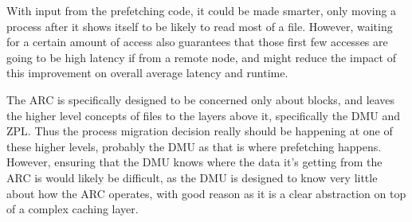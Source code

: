 With input from the prefetching code, it could be made smarter, 
only moving a process after it shows itself to be likely to read most of a file.
However, waiting for a certain amount of access also guarantees that those first few accesses are going to be high latency if from a remote node, and might reduce the impact of this improvement on overall average latency and runtime.

The ARC is specifically designed to be concerned only about blocks, and leaves the higher level concepts of
files to the layers above it, specifically the DMU and ZPL.
Thus the process migration decision really should be happening at one of these higher levels,
probably the DMU as that is where prefetching happens.
However, ensuring that the DMU knows where the data it's getting from the ARC is would likely be difficult,
as the DMU is designed to know very little about how the ARC operates, with good reason as it is a clear
abstraction on top of a complex caching layer.


